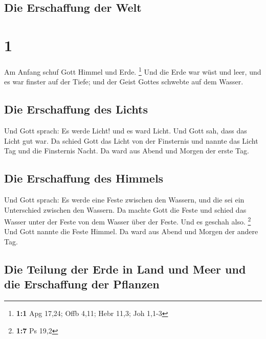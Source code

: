 \hypertarget{die-erschaffung-der-welt}{%
\subsection{Die Erschaffung der Welt}\label{die-erschaffung-der-welt}}

\hypertarget{section}{%
\section{1}\label{section}}

 Am Anfang schuf Gott Himmel und Erde. \footnote{\textbf{1:1}
  Apg 17,24; Offb 4,11; Hebr 11,3; Joh 1,1-3}  Und die
Erde war wüst und leer, und es war finster auf der Tiefe; und der Geist
Gottes schwebte auf dem Wasser.

\hypertarget{die-erschaffung-des-lichts}{%
\subsection{Die Erschaffung des
Lichts}\label{die-erschaffung-des-lichts}}

 Und Gott sprach: Es werde Licht! und es ward Licht.
 Und Gott sah, dass das Licht gut war. Da schied Gott das
Licht von der Finsternis  und nannte das Licht Tag und die
Finsternis Nacht. Da ward aus Abend und Morgen der erste Tag.

\hypertarget{die-erschaffung-des-himmels}{%
\subsection{Die Erschaffung des
Himmels}\label{die-erschaffung-des-himmels}}

 Und Gott sprach: Es werde eine Feste zwischen den
Wassern, und die sei ein Unterschied zwischen den Wassern.
 Da machte Gott die Feste und schied das Wasser unter der
Feste von dem Wasser über der Feste. Und es geschah also. \footnote{\textbf{1:7}
  Ps 19,2}  Und Gott nannte die Feste Himmel. Da ward aus
Abend und Morgen der andere Tag.

\hypertarget{die-teilung-der-erde-in-land-und-meer-und-die-erschaffung-der-pflanzen}{%
\subsection{Die Teilung der Erde in Land und Meer und die Erschaffung
der
Pflanzen}\label{die-teilung-der-erde-in-land-und-meer-und-die-erschaffung-der-pflanzen}}

